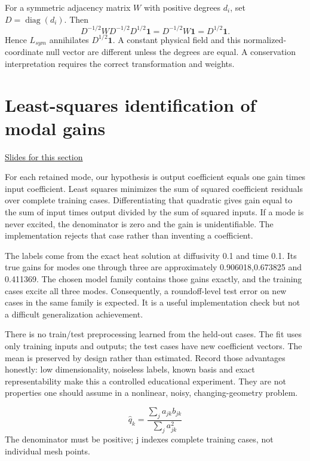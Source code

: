\documentclass[11pt,letterpaper]{article}
\theoremstyle{definition}\newtheorem{definition}{Definition}\newtheorem{example}{Example}
\numberwithin{equation}{section}
\begin{document}
For a symmetric adjacency matrix $W$ with positive degrees $d_i$, set $D=\operatorname{diag}(d_i)$. Then
\[
 D^{-1/2}WD^{-1/2}D^{1/2}\boldsymbol1
 =D^{-1/2}W\boldsymbol1=D^{1/2}\boldsymbol1.
\]
Hence $L_{sym}$ annihilates $D^{1/2}\boldsymbol1$. A constant physical field and this normalized-coordinate null vector are different unless the degrees are equal. A conservation interpretation requires the correct transformation and weights.
\section{Least-squares identification of modal gains}
\hypertarget{note-least-squares-identification-of-modal-gains}{}\label{note:least-squares-identification-of-modal-gains}
{\small \href{slides.html\#frame=least-squares-for-one-gain\&step=1}{Slides for this section}}\par
For each retained mode, our hypothesis is output coefficient equals one gain times input coefficient. Least squares minimizes the sum of squared coefficient residuals over complete training cases. Differentiating that quadratic gives gain equal to the sum of input times output divided by the sum of squared inputs. If a mode is never excited, the denominator is zero and the gain is unidentifiable. The implementation rejects that case rather than inventing a coefficient.

The labels come from the exact heat solution at diffusivity 0.1 and time 0.1. Its true gains for modes one through three are approximately 0.906018,0.673825 and 0.411369. The chosen model family contains those gains exactly, and the training cases excite all three modes. Consequently, a roundoff-level test error on new cases in the same family is expected. It is a useful implementation check but not a difficult generalization achievement.

There is no train/test preprocessing learned from the held-out cases. The fit uses only training inputs and outputs; the test cases have new coefficient vectors. The mean is preserved by design rather than estimated. Record those advantages honestly: low dimensionality, noiseless labels, known basis and exact representability make this a controlled educational experiment. They are not properties one should assume in a nonlinear, noisy, changing-geometry problem.

\[
\hat q_k=\frac{\sum_j a_{jk}b_{jk}}{\sum_j a_{jk}^2}
\]
The denominator must be positive; j indexes complete training cases, not individual mesh points.
\end{document}

